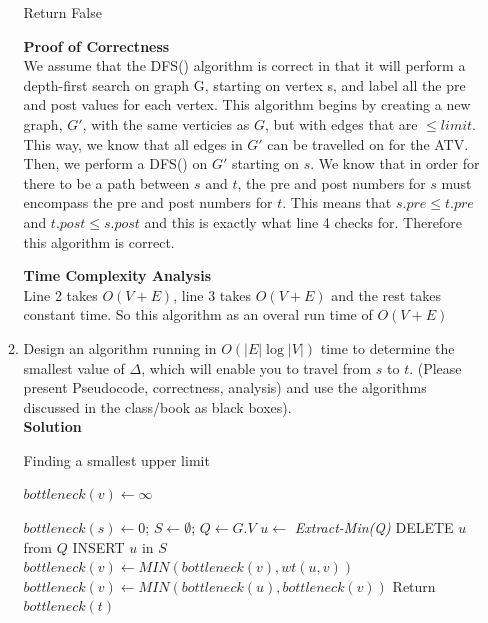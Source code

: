 \documentclass[12pt]{article}
\begin{document}
\begin{enumerate}
\begin{enumerate}
\begin{algorithm}
\begin{algorithmic}[1]
	\State Return False
\EndProcedure
\end{algorithmic}
\end{algorithm}

\textbf{Proof of Correctness}
\\We assume that the DFS() algorithm is correct in that it will perform a depth-first search on graph G, starting on vertex s, and label all the pre and post values for each vertex. This algorithm begins by creating a new graph, $G'$, with the same verticies as $G$, but with edges that are $\leq limit$. This way, we know that all edges in $G'$ can be travelled on for the ATV. Then, we perform a DFS() on $G'$ starting on $s$. We know that in order for there to be a path between $s$ and $t$, the pre and post numbers for $s$ must encompass the pre and post numbers for $t$. This means that {$s.pre\leq t.pre$ and $t.post \leq s.post$ } and this is exactly what line 4 checks for. Therefore this algorithm is correct.

\textbf{Time Complexity Analysis}
\\Line 2 takes $O(V+E)$, line 3 takes $O(V+E)$ and the rest takes constant time. So this algorithm as an overal run time of $O(V+E)$

\newpage
\item \color{blue}Design an algorithm running in $O(|E|\log |V|)$ time to determine the smallest value of $\Delta$, which will enable you to travel from $s$ to $t$. (Please present Pseudocode, correctness, analysis) and use the algorithms discussed in the class/book as black boxes).
\\
\color{black}
\textbf{Solution}
\begin{algorithm}
\caption{Finding a smallest upper limit}
\begin{algorithmic}[1]
  
		\State $bottleneck(v) \gets \infty$
	\EndFor
	
	\State $bottleneck(s) \gets 0$; $S \gets \emptyset$; $Q \gets G.V$
		\State $u \gets$ {\em Extract-Min(Q)}
		\State DELETE $u$ from $Q$
		\State INSERT $u$ in $S$
				\State $bottleneck(v) \gets MIN(bottleneck(v),wt(u,v))$
			\Else
				\State $bottleneck(v) \gets MIN(bottleneck(u),bottleneck(v))$
			\EndIf
		\EndFor
	\EndWhile
	\State Return $bottleneck(t)$
\EndProcedure
\end{algorithmic}
\end{algorithm}


\end{enumerate}
\end{enumerate}
\end{document}
